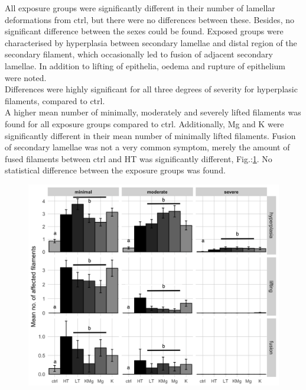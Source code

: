 \documentclass[twoside]{article}
\begin{document}
\begin{multicols}{2}
All exposure groups were significantly different in their number of lamellar deformations from ctrl, but there were no differences between these. Besides, no significant difference between the sexes could be found. 
Exposed groups were characterised by hyperplasia between secondary lamellae and distal region of the secondary filament, which occasionally led to fusion of adjacent secondary lamellae. In addition to lifting of epithelia, oedema and rupture of epithelium were noted.
\\
Differences were highly significant for all three degrees of severity for hyperplasic filaments, compared to ctrl. \\

A higher mean number of minimally, moderately and severely lifted filaments was found for all exposure groups compared to ctrl. Additionally, Mg and K were significantly different in their mean number of minimally lifted filaments. 
Fusion of secondary lamellae was not a very common symptom, merely the amount of fused filaments between ctrl and HT was significantly different, Fig.:\ref{fig:gills}. No statistical difference between the exposure groups was found.



\end{multicols}

\begin{figure}[H]
 \centering
 \includegraphics[scale=.185]{ggbarplot_gills2305.png}
 \label{fig:gills}
\end{figure}
\FloatBarrier
\end{document}
